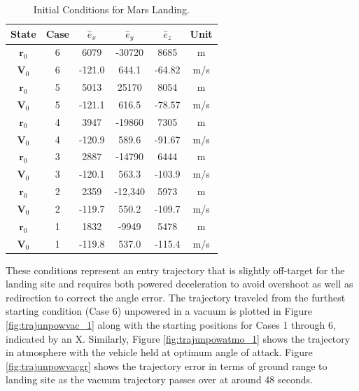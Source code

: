 \begin{table}[hbt]
	\centering
	\begin{minipage}{3.5in}
		\centering
		\caption{Initial Conditions for Mars Landing\label{tab:IC}.}
		\begin{tabular}{|c||c|c|c|c|c||}    \hline
			State &	Case & $\hat{e}_x$  &  $\hat{e}_y$ & $\hat{e}_z$ & Unit \\ \hline \hline
			$\bm{r}_0$ & 6 & 6079  & -30720 & 8685 & m \\ \hline
			$\bm{V}_0$ & 6 & -121.0  & 644.1 & -64.82 & m/s \\ \hline
			$\bm{r}_0$ & 5 & 5013  & 25170 & 8054 & m \\ \hline
			$\bm{V}_0$ & 5 & -121.1  & 616.5 & -78.57 & m/s \\ \hline
			$\bm{r}_0$ & 4 & 3947  & -19860 & 7305 & m\\ \hline
			$\bm{V}_0$ & 4 & -120.9  & 589.6 & -91.67 & m/s \\ \hline
			$\bm{r}_0$ & 3 & 2887  & -14790 & 6444 & m \\ \hline
			$\bm{V}_0$ & 3 & -120.1  & 563.3 & -103.9 & m/s \\ \hline
			$\bm{r}_0$ & 2 & 2359  & -12,340 & 5973 & m \\ \hline
			$\bm{V}_0$ & 2 & -119.7  & 550.2 & -109.7 & m/s \\ \hline
			$\bm{r}_0$ & 1 & 1832 & -9949 & 5478 & m \\ \hline
			$\bm{V}_0$ & 1 & -119.8 & 537.0 & -115.4 & m/s \\ \hline
		\end{tabular}
	\end{minipage}
\end{table}

These conditions represent an entry trajectory that is slightly off-target for the landing site and requires both powered deceleration to avoid overshoot as well as redirection to correct the angle error. The trajectory traveled from the furthest starting condition (Case 6) unpowered in a vacuum is plotted in Figure \ref{fig:trajunpowvac_1} along with the starting positions for Cases 1 through 6, indicated by an X. Similarly, Figure \ref{fig:trajunpowatmo_1} shows the trajectory in atmosphere with the vehicle held at optimum angle of attack. Figure \ref{fig:trajunpowvacgr} shows the trajectory error in terms of ground range to landing site as the vacuum trajectory passes over at around 48 seconds.

